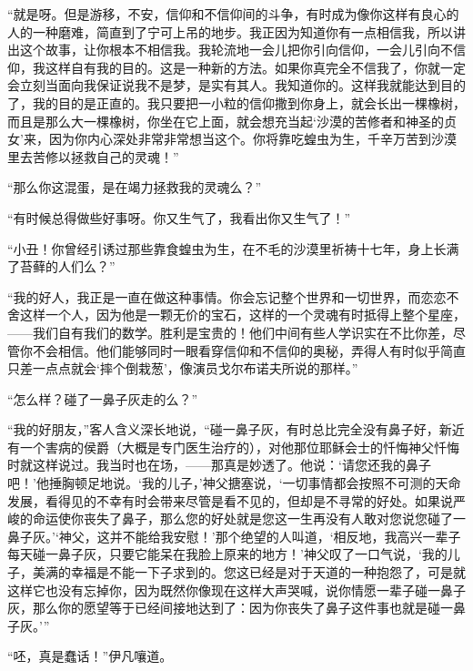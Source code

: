\par “就是呀。但是游移，不安，信仰和不信仰间的斗争，有时成为像你这样有良心的人的一种磨难，简直到了宁可上吊的地步。我正因为知道你有一点相信我，所以讲出这个故事，让你根本不相信我。我轮流地一会儿把你引向信仰，一会儿引向不信仰，我这样自有我的目的。这是一种新的方法。如果你真完全不信我了，你就一定会立刻当面向我保证说我不是梦，是实有其人。我知道你的。这样我就能达到目的了，我的目的是正直的。我只要把一小粒的信仰撒到你身上，就会长出一棵橡树，而且是那么大一棵橡树，你坐在它上面，就会想充当起‘沙漠的苦修者和神圣的贞女’来，因为你内心深处非常非常想当这个。你将靠吃蝗虫为生，千辛万苦到沙漠里去苦修以拯救自己的灵魂！”
\par “那么你这混蛋，是在竭力拯救我的灵魂么？”
\par “有时候总得做些好事呀。你又生气了，我看出你又生气了！”
\par “小丑！你曾经引诱过那些靠食蝗虫为生，在不毛的沙漠里祈祷十七年，身上长满了苔藓的人们么？”
\par “我的好人，我正是一直在做这种事情。你会忘记整个世界和一切世界，而恋恋不舍这样一个人，因为他是一颗无价的宝石，这样的一个灵魂有时抵得上整个星座，——我们自有我们的数学。胜利是宝贵的！他们中间有些人学识实在不比你差，尽管你不会相信。他们能够同时一眼看穿信仰和不信仰的奥秘，弄得人有时似乎简直只差一点点就会‘摔个倒栽葱’，像演员戈尔布诺夫所说的那样。”
\par “怎么样？碰了一鼻子灰走的么？”
\par “我的好朋友，”客人含义深长地说，“碰一鼻子灰，有时总比完全没有鼻子好，新近有一个害病的侯爵（大概是专门医生治疗的），对他那位耶稣会士的忏悔神父忏悔时就这样说过。我当时也在场，——那真是妙透了。他说：‘请您还我的鼻子吧！’他捶胸顿足地说。‘我的儿子，’神父搪塞说，‘一切事情都会按照不可测的天命发展，看得见的不幸有时会带来尽管是看不见的，但却是不寻常的好处。如果说严峻的命运使你丧失了鼻子，那么您的好处就是您这一生再没有人敢对您说您碰了一鼻子灰。’‘神父，这并不能给我安慰！’那个绝望的人叫道，‘相反地，我高兴一辈子每天碰一鼻子灰，只要它能呆在我脸上原来的地方！’神父叹了一口气说，‘我的儿子，美满的幸福是不能一下子求到的。您这已经是对于天道的一种抱怨了，可是就这样它也没有忘掉你，因为既然你像现在这样大声哭喊，说你情愿一辈子碰一鼻子灰，那么你的愿望等于已经间接地达到了：因为你丧失了鼻子这件事也就是碰一鼻子灰。’”
\par “呸，真是蠢话！”伊凡嚷道。
